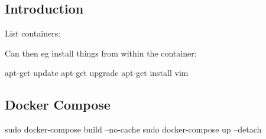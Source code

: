 
\subsection{Introduction}

List containers:

Can then eg install things from within the container:

\begin{verbitim}
apt-get update
apt-get upgrade
apt-get install vim
\end{verbitim}


\subsection{Docker Compose}

\begin{verbitim}
sudo docker-compose build --no-cache
sudo docker-compose up --detach
\end{verbitim}

